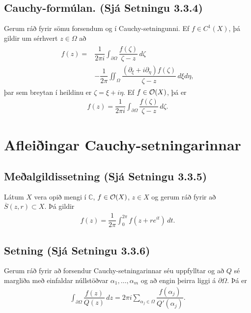 \documentclass[a4paper,10pt,icelandic]{sphinxmanual}
\begin{document}
\subsection{Cauchy-formúlan. (Sjá Setningu 3.3.4)}
\label{\detokenize{Kafli03:cauchy-formulan-sja-setningu-3-3-4}}
Gerum ráð fyrir sömu forsendum og í Cauchy-setningunni. Ef \(f\in C^1(X)\), þá gildir um sérhvert \(z\in \Omega\) að
\begin{equation*}
\begin{split}\begin{aligned}
f(z)=&\dfrac 1{2 \pi i}\int_{\partial\Omega}\dfrac
{f(\zeta)}{\zeta-z}\, d\zeta \\
&-\dfrac 1{2\pi}\iint_{\Omega}
\dfrac{(\partial_\xi+i\partial_\eta)f(\zeta)}
{\zeta-z}\, d\xi d\eta,
\end{aligned}\end{split}
\end{equation*}
þar sem breytan í heildinu er \({\zeta}={\xi}+i\eta\). Ef
\(f\in {\cal O}(X)\), þá er
\begin{equation*}
\begin{split}f(z)=\dfrac 1{2 \pi i}\int_{\partial\Omega}\dfrac
{f(\zeta)}{\zeta-z}\, d\zeta.\end{split}
\end{equation*}

\section{Afleiðingar Cauchy-setningarinnar}
\label{\detokenize{Kafli03:afleiingar-cauchy-setningarinnar}}

\subsection{Meðalgildissetning (Sjá Setningu 3.3.5)}
\label{\detokenize{Kafli03:mealgildissetning-sja-setningu-3-3-5}}
Látum \(X\) vera opið mengi í \({\mathbb{C}}\), \(f\in {\cal O}(X)\), \(z\in X\) og gerum ráð fyrir að \(\overline S(z,r)\subset X\). Þá gildir
\begin{equation*}
\begin{split}f(z)=\dfrac 1{2\pi} \int_0^{2\pi}f(z+re^{it})\, dt.\end{split}
\end{equation*}

\subsection{Setning (Sjá Setningu 3.3.6)}
\label{\detokenize{Kafli03:setning-sja-setningu-3-3-6}}
Gerum ráð fyrir að forsendur Cauchy-setningarinnar séu uppfylltar og að \(Q\) sé margliða með einfaldar núllstöðvar \(\alpha_1,\dots,\alpha_m\) og að engin þeirra liggi á \(\partial\Omega\). Þá er
\begin{equation*}
\begin{split}\int_{\partial\Omega} \dfrac{f(z)}{Q(z)} \, dz =
2\pi i\sum_{\alpha_j\in \Omega}
\dfrac{f(\alpha_j)}{Q'(\alpha_j)}.\end{split}
\end{equation*}
\end{document}
